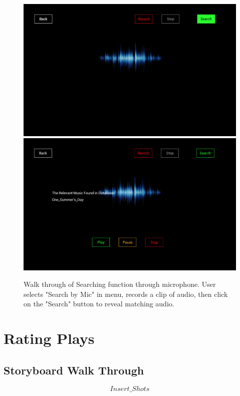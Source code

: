 \documentclass[whitelogo,12pt]{tudelft-report}
\begin{document}
\begin{figure}[!htb]
  \includegraphics[width=\linewidth]{sm3}
\endminipage\hfill
{}
  \includegraphics[width=\linewidth]{sm4}
\endminipage\hfill

\caption{Walk through of Searching function through microphone. User selects "Search by Mic" in menu, records a clip of  audio, then click on the "Search" button to reveal matching audio.}
\label{fig:sm}
\end{figure}

\section{Rating Plays}
\subsection{Storyboard Walk Through}
\[Insert\_Shots\]
\end{document}
